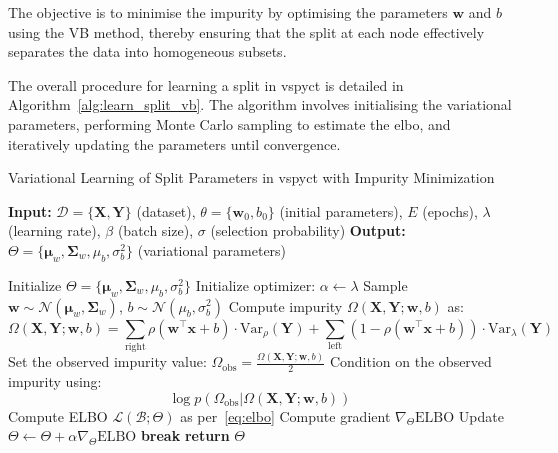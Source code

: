 \documentclass[3p,review,authoryear]{elsarticle}
\begin{document}
The objective is to minimise the impurity by optimising the parameters \(\mathbf{w}\) and \(b\) using the VB method, thereby ensuring that the split at each node effectively separates the data into homogeneous subsets.

The overall procedure for learning a split in \gls{vspyct} is detailed in Algorithm~\ref{alg:learn_split_vb}.
The algorithm involves initialising the variational parameters, performing Monte Carlo sampling to estimate the \gls{elbo}, and iteratively updating the parameters until convergence.

\begin{algorithm}[h!]
\caption{Variational Learning of Split Parameters in \gls{vspyct} with Impurity Minimization}
\label{alg:learn_split_vb}
\begin{algorithmic}[1]
    \State \textbf{Input:} $\mathcal{D} = \{\mathbf{X}, \mathbf{Y}\}$ (dataset), $\theta = \{\mathbf{w}_0, b_0\}$ (initial parameters), $E$ (epochs), $\lambda$ (learning rate), $\beta$ (batch size), $\sigma$ (selection probability)
    \State \textbf{Output:} $\Theta = \{\boldsymbol{\mu}_w, \boldsymbol{\Sigma}_w, \mu_b, \sigma_b^2\}$ (variational parameters)
 
        \State Initialize $\Theta = \{\boldsymbol{\mu}_w, \boldsymbol{\Sigma}_w, \mu_b, \sigma_b^2\}$ 
        \State Initialize optimizer: $\alpha \gets \lambda$
         
                \State Sample $\mathbf{w} \sim \mathcal{N}(\boldsymbol{\mu}_w, \boldsymbol{\Sigma}_w)$, $b \sim \mathcal{N}(\mu_b, \sigma_b^2)$
                \State Compute impurity $\Omega(\mathbf{X}, \mathbf{Y}; \mathbf{w}, b)$ as:
                \[
                \Omega(\mathbf{X}, \mathbf{Y}; \mathbf{w}, b) = \sum_{\text{right}} \rho(\mathbf{w}^\top \mathbf{x} + b) \cdot \text{Var}_\rho(\mathbf{Y}) + \sum_{\text{left}} (1 - \rho(\mathbf{w}^\top \mathbf{x} + b)) \cdot \text{Var}_\lambda(\mathbf{Y})
                \]
                \State Set the observed impurity value: $\Omega_\text{obs} = \frac{\Omega(\mathbf{X}, \mathbf{Y}; \mathbf{w}, b)}{2}$
                \State Condition on the observed impurity using:
                \[
                \log p(\Omega_\text{obs}|\Omega(\mathbf{X}, \mathbf{Y}; \mathbf{w}, b))
                \]
                \State Compute ELBO $\mathcal{L}(\mathcal{B}; \Theta)$ as per~\eqref{eq:elbo}
                \State Compute gradient $\nabla_{\Theta} \text{ELBO}$
                \State Update $\Theta \gets \Theta + \alpha \nabla_{\Theta} \text{ELBO}$ 
            \EndFor
                \State \textbf{break}
            \EndIf
        \EndFor
        \State \textbf{return} $\Theta$
    \EndProcedure
\end{algorithmic}
\end{algorithm}
\end{document}
